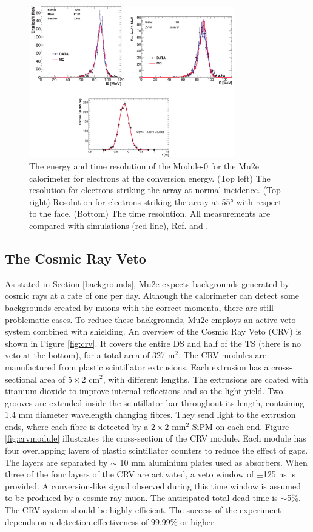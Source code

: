 \begin{figure}[!h]
    \centering
    \includegraphics[width =0.8\textwidth]{figures/png/Screenshot_20240330_105520.png}
    \caption{The energy and time resolution of the Module-0 for the Mu2e calorimeter for electrons at the conversion energy. (Top left) The resolution for electrons striking the
    array at normal incidence. (Top right) Resolution for electrons striking the array at 55° with respect to the face. (Bottom) The time resolution. 
    All measurements are compared with simulations (red line), Ref. \cite{bobbb} and \cite{calo95}.}
                \label{fig:calores}
                \end{figure}
\subsection{The Cosmic Ray Veto}\label{CRV}
As stated in Section \ref{backgrounds}, Mu2e expects backgrounds generated by cosmic rays 
at a rate of one per day. Although the calorimeter can detect some backgrounds created 
by muons with the correct momenta, there are still problematic cases. To reduce these 
backgrounds, Mu2e employs an active veto system combined with shielding. An overview 
of the Cosmic Ray Veto (CRV) is shown in Figure \ref{fig:crv}. It covers the entire 
DS and half of the TS (there is no veto at the bottom), for a total area of 327 m$^2$.
The CRV modules are manufactured from plastic scintillator extrusions. Each extrusion 
has a cross-sectional area of $5 \times 2$ cm$^2$, with different lengths. The extrusions 
are coated with titanium dioxide to improve internal reflections and so the light yield. 
Two grooves are extruded inside the scintillator bar throughout its length, containing 
1.4 mm diameter wavelength changing fibres. They send light to the extrusion ends, 
where each fibre is detected by a $2 \times 2$ mm$^2$ SiPM on each end. Figure \ref{fig:crvmodule} 
illustrates the cross-section of the CRV module. Each module has four overlapping layers of plastic 
scintillator counters to reduce the effect of gaps. The layers are separated by $\sim$ 10 mm aluminium 
plates used as absorbers. When three of the four layers of the CRV are activated, a veto window of $\pm$125 ns 
is provided. A conversion-like signal observed during this time window is assumed to be produced by a cosmic-ray muon. 
The anticipated total dead time is $\sim$5\%. The CRV system should be highly efficient. 
The success of the experiment depends on a detection effectiveness of 99.99\% or higher.

